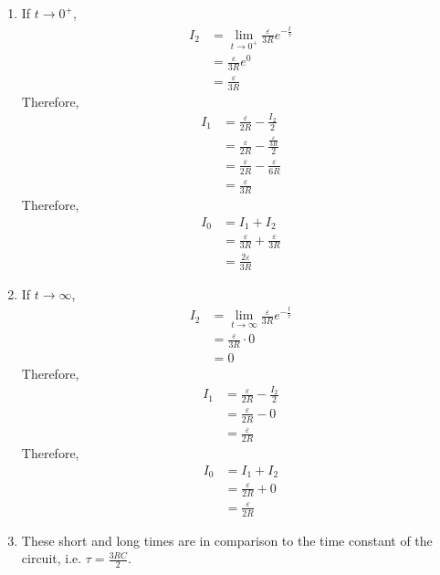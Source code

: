\documentclass[fleqn, a4paper, 12pt, twoside]{article}
\theoremstyle{definition}
\theoremstyle{theorem}
\begin{document}
\begin{solution}
	\begin{enumerate}[leftmargin = *]
		\item
			If $t \to 0^+$,
			\begin{align*}
				I_2 &= \lim\limits_{t \to 0^+} \frac{\varepsilon}{3 R} e^{-\frac{t}{\tau}}\\
				&= \frac{\varepsilon}{3 R} e^0\\
				&= \frac{\varepsilon}{3 R}
			\end{align*}
			Therefore,
			\begin{align*}
				I_1 &= \frac{\varepsilon}{2 R} - \frac{I_2}{2}\\
				&= \frac{\varepsilon}{2 R} - \frac{\frac{\varepsilon}{3 R}}{2}\\
				&= \frac{\varepsilon}{2 R} - \frac{\varepsilon}{6 R}\\
				&= \frac{\varepsilon}{3 R}
			\end{align*}
			Therefore,
			\begin{align*}
				I_0 &= I_1 + I_2\\
				&= \frac{\varepsilon}{3 R} + \frac{\varepsilon}{3 R}\\
				&= \frac{2 \varepsilon}{3 R}
			\end{align*}
		\item
			If $t \to \infty$,
			\begin{align*}
				I_2 &= \lim\limits_{t \to \infty} \frac{\varepsilon}{3 R} e^{-\frac{t}{\tau}}\\
				&= \frac{\varepsilon}{3 R} \cdot 0\\
				&= 0
			\end{align*}
			Therefore,
			\begin{align*}
				I_1 &= \frac{\varepsilon}{2 R} - \frac{I_2}{2}\\
				&= \frac{\varepsilon}{2 R} - 0\\
				&= \frac{\varepsilon}{2 R}
			\end{align*}
			Therefore,
			\begin{align*}
				I_0 &= I_1 + I_2\\
				&= \frac{\varepsilon}{2 R} + 0\\
				&= \frac{\varepsilon}{2 R}
			\end{align*}
		\item
			These short and long times are in comparison to the time constant of the circuit, i.e. $\tau = \frac{3 R C}{2}$.
	\end{enumerate}
\end{solution}
\end{document}
